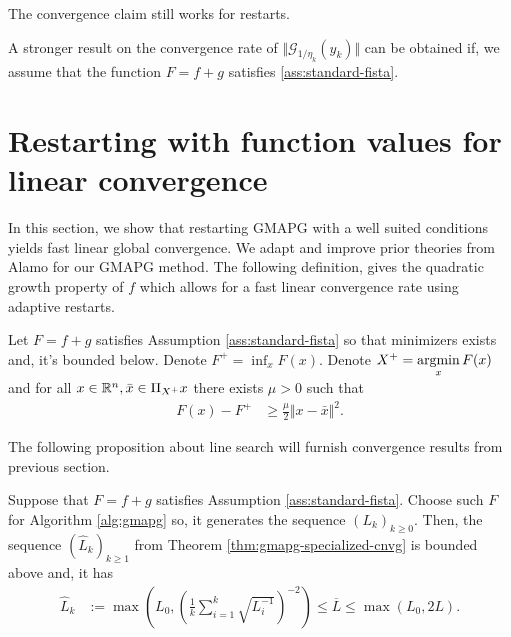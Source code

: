 \documentclass[12pt]{report}
\begin{document}
        \begin{remark}
            The convergence claim still works for restarts. 
        \end{remark}
        \par
        A stronger result on the convergence rate of $\Vert \mathcal G_{1/\eta_k}(y_k)\Vert$ can be obtained if, we assume that the function $F=f + g$ satisfies \ref{ass:standard-fista}. 
    
    \section{Restarting with function values for linear convergence}
        In this section, we show that restarting GMAPG with a well suited conditions yields fast linear global convergence. 
        We adapt and improve prior theories from Alamo \cite{alamo_restart_2019} for our GMAPG method. 
        The following definition, gives the quadratic growth property of $f$ which allows for a fast linear convergence rate using adaptive restarts. 
        \begin{assumption}\label{ass:q-growth-ch2}
            Let $F = f + g$ satisfies Assumption \ref{ass:standard-fista} so that minimizers exists and, it's bounded below. 
            Denote $F^+ = \inf_{x} F(x)$. 
            Denote $X^+ = \mathop{\rm argmin}\limits_{x} F(x)$ and for all $x \in \mathbb R^n, \bar x \in \Pi_{X^+}x$ there exists $\mu > 0$ such that 
            \begin{align*}
                F(x) - F^+ &\ge \frac{\mu}{2}\Vert x - \bar x\Vert^2. 
            \end{align*}
        \end{assumption}
        The following proposition about line search will furnish convergence results from previous section. 
        \begin{proposition}\label{prop:bnded-lip-ls}
            Suppose that $F = f + g$ satisfies Assumption \ref{ass:standard-fista}. 
            Choose such $F$ for Algorithm \ref{alg:gmapg} so, it generates the sequence $(L_k)_{k\ge 0}$. 
            Then, the sequence $(\hat L_k)_{k \ge 1}$ from Theorem \ref{thm:gmapg-specialized-cnvg} is bounded above and, it has
            \begin{align*}
                \widehat L_k &:= \max\left(
                    L_0, \left(
                        \frac{1}{k} \sum_{i = 1}^{k} \sqrt{L_i^{-1}}
                    \right)^{-2}
                \right)\le  \overline L \le \max\left(L_0,  2L\right). 
            \end{align*}
        \end{proposition}
\end{document}
